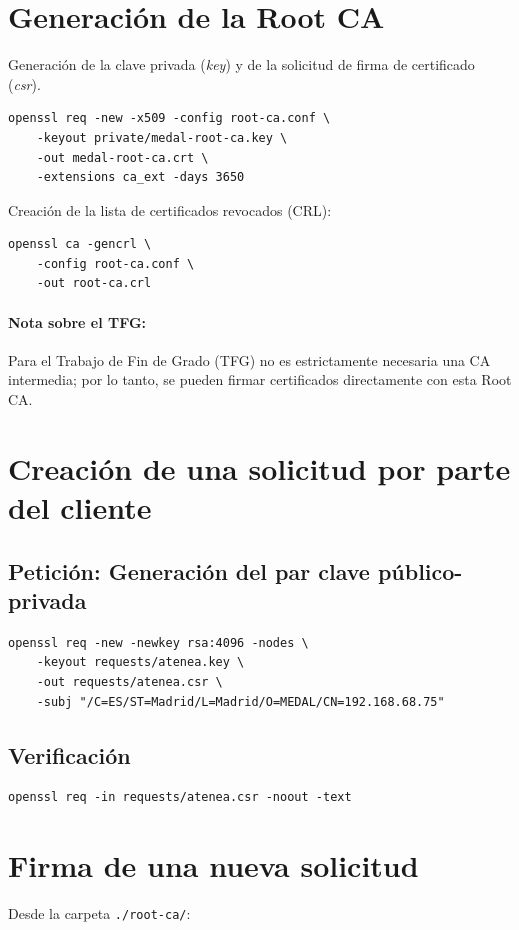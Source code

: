 \documentclass[12pt,a4paper]{report}
\begin{document}
\section{Generación de la Root CA}
Generación de la clave privada (\textit{key}) y de la solicitud de firma de certificado (\textit{csr}).

\begin{lstlisting}
openssl req -new -x509 -config root-ca.conf \
    -keyout private/medal-root-ca.key \
    -out medal-root-ca.crt \
    -extensions ca_ext -days 3650
\end{lstlisting}

Creación de la lista de certificados revocados (CRL):
\begin{lstlisting}
openssl ca -gencrl \
    -config root-ca.conf \
    -out root-ca.crl
\end{lstlisting}

\paragraph{Nota sobre el TFG:} Para el Trabajo de Fin de Grado (TFG) no es estrictamente necesaria una CA intermedia; por lo tanto, se pueden firmar certificados directamente con esta Root CA.

\section{Creación de una solicitud por parte del cliente}

\subsection{Petición: Generación del par clave público-privada}
\begin{lstlisting}
openssl req -new -newkey rsa:4096 -nodes \
    -keyout requests/atenea.key \
    -out requests/atenea.csr \
    -subj "/C=ES/ST=Madrid/L=Madrid/O=MEDAL/CN=192.168.68.75"
\end{lstlisting}

\subsection{Verificación}
\begin{lstlisting}
openssl req -in requests/atenea.csr -noout -text
\end{lstlisting}

\section{Firma de una nueva solicitud}
Desde la carpeta \texttt{./root-ca/}:
\end{document}
